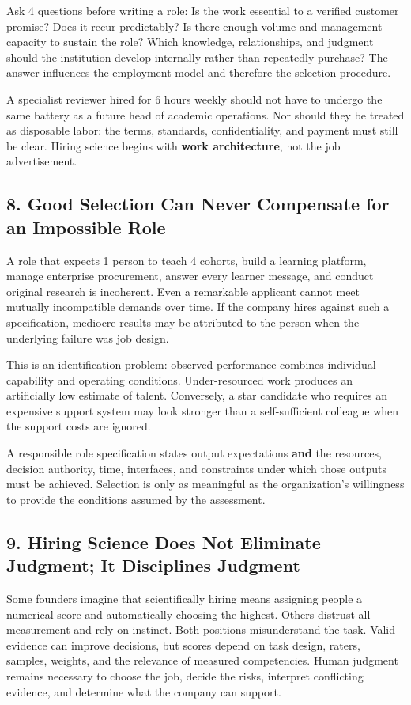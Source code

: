 Ask 4 questions before writing a role: Is the work essential to a verified customer promise? Does it recur predictably? Is there enough volume and management capacity to sustain the role? Which knowledge, relationships, and judgment should the institution develop internally rather than repeatedly purchase? The answer influences the employment model and therefore the selection procedure.

A specialist reviewer hired for 6 hours weekly should not have to undergo the same battery as a future head of academic operations. Nor should they be treated as disposable labor: the terms, standards, confidentiality, and payment must still be clear. Hiring science begins with \textbf{work architecture}, not the job advertisement.

\subsection*{8. Good Selection Can Never Compensate for an Impossible Role}

A role that expects 1 person to teach 4 cohorts, build a learning platform, manage enterprise procurement, answer every learner message, and conduct original research is incoherent. Even a remarkable applicant cannot meet mutually incompatible demands over time. If the company hires against such a specification, mediocre results may be attributed to the person when the underlying failure was job design.

This is an identification problem: observed performance combines individual capability and operating conditions. Under-resourced work produces an artificially low estimate of talent. Conversely, a star candidate who requires an expensive support system may look stronger than a self-sufficient colleague when the support costs are ignored.

A responsible role specification states output expectations \textbf{and} the resources, decision authority, time, interfaces, and constraints under which those outputs must be achieved. Selection is only as meaningful as the organization's willingness to provide the conditions assumed by the assessment.

\subsection*{9. Hiring Science Does Not Eliminate Judgment; It Disciplines Judgment}

Some founders imagine that scientifically hiring means assigning people a numerical score and automatically choosing the highest. Others distrust all measurement and rely on instinct. Both positions misunderstand the task. Valid evidence can improve decisions, but scores depend on task design, raters, samples, weights, and the relevance of measured competencies. Human judgment remains necessary to choose the job, decide the risks, interpret conflicting evidence, and determine what the company can support.

